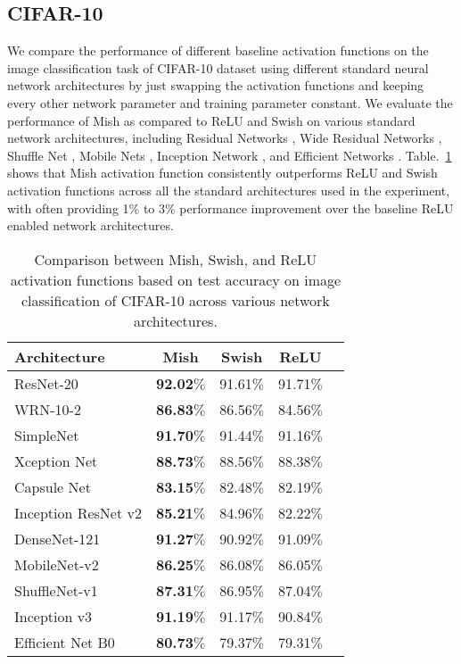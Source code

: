 \documentclass{bmvc2k}
\begin{document}
\subsection{CIFAR-10}

We compare the performance of different baseline activation functions on the image classification task of CIFAR-10 dataset \cite{krizhevsky2009learning} using different standard neural network architectures by just swapping the activation functions and keeping every other network parameter and training parameter constant. We evaluate the performance of Mish as compared to ReLU and Swish on various standard network architectures, including Residual Networks \cite{he2016deep}, Wide Residual Networks \cite{zagoruyko2016wide}, Shuffle Net \cite{zhang2018shufflenet}, Mobile Nets \cite{howard2017mobilenets}, Inception Network \cite{szegedy2015going}, and Efficient Networks \cite{tan2019efficientnet}. Table.~\ref{tab:cifar10} shows that Mish activation function consistently outperforms ReLU and Swish activation functions across all the standard architectures used in the experiment, with often providing 1$\%$ to 3$\%$ performance improvement over the baseline ReLU enabled network architectures. 

\begin{table}[h]
	\begin{center}
		\begin{tabular}{|l|c|c|c|r|}
			\hline
			Architecture & Mish & Swish & ReLU\\
			\hline\hline
			ResNet-20 \cite{he2016deep} & \textbf{92.02$\%$} & 91.61$\%$ & 91.71$\%$ \\
			WRN-10-2 \cite{zagoruyko2016wide} & \textbf{86.83$\%$} & 86.56$\%$ & 84.56$\%$ \\
			SimpleNet \cite{hasanpour2016lets} & \textbf{91.70$\%$} & 91.44$\%$ & 91.16$\%$ \\
			Xception Net \cite{chollet2017xception} & \textbf{88.73$\%$} & 88.56$\%$ & 88.38$\%$ \\
			Capsule Net \cite{sabour2017dynamic} & \textbf{83.15$\%$} & 82.48$\%$ & 82.19$\%$ \\
			Inception ResNet v2 \cite{szegedy2015going} & \textbf{85.21$\%$} & 84.96$\%$ & 82.22$\%$ \\
			DenseNet-121 \cite{huang2017densely} & \textbf{91.27$\%$} & 90.92$\%$ & 91.09$\%$ \\
			MobileNet-v2 \cite{howard2017mobilenets} & \textbf{86.25$\%$} & 86.08$\%$ & 86.05$\%$ \\
			ShuffleNet-v1 \cite{zhang2018shufflenet} & \textbf{87.31$\%$} & 86.95$\%$ & 87.04$\%$ \\
			Inception v3 \cite{szegedy2015going} & \textbf{91.19$\%$} & 91.17$\%$ & 90.84$\%$ \\
			Efficient Net B0 \cite{tan2019efficientnet} & \textbf{80.73$\%$} & 79.37$\%$ & 79.31$\%$ \\
			\hline
		\end{tabular}
	\end{center}
	\caption{Comparison between Mish, Swish, and ReLU activation functions based on test accuracy on image classification of CIFAR-10 across various network architectures.}
	\label{tab:cifar10}
\end{table}
\end{document}
